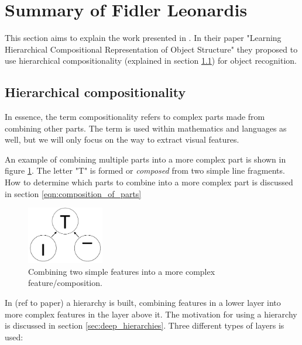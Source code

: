 \section{Summary of Fidler Leonardis }
\label{sec:fidler}
This section aims to explain the work presented in \cite{fidler2009learning}. 
In their paper "Learning Hierarchical Compositional Representation of Object Structure" they proposed to use hierarchical compositionality (explained in section \ref{sec:hierarchical-comp}) for object recognition. 

\subsection{Hierarchical compositionality}
\label{sec:hierarchical-comp}
In essence, the term compositionality refers to complex parts made from combining other parts. 
The term is used within mathematics and languages as well, but we will only focus on the way to extract visual features. 

An example of combining multiple parts into a more complex part is shown in figure \ref{fig:compositionality1}. 
The letter "T" is formed or \textit{composed} from two simple line fragments. 
How to determine which parts to combine into a more complex part is discussed in section \ref{eqn:composition_of_parts}

\begin{figure}[h!] %
\centering
\includegraphics[width=0.3\textwidth]{graphics/compositionality1}
\caption{Combining two simple features into a more complex feature/composition.}
\label{fig:compositionality1}
\end{figure}

In (ref to paper) a hierarchy is built, combining features in a lower layer into more complex features in the layer above it. 
The motivation for using a hierarchy is discussed in section \ref{sec:deep_hierarchies}. 
Three different types of layers is used: 

